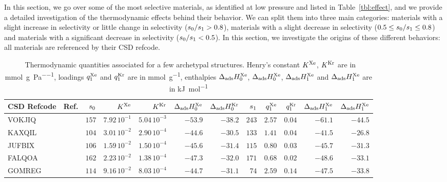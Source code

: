 \documentclass[main.tex]{subfiles}
\begin{document}
In this section, we go over some of the most selective materials, as identified at low pressure and listed in Table~\ref{tbl:effect}, and we provide a detailed investigation of the thermodynamic effects behind their behavior. We can split them into three main categories: materials with a slight increase in selectivity or little change in selectivity ($s_{\text{0}}/s_{\text{1}} > 0.8$), materials with a slight decrease in selectivity ($0.5 \le s_{\text{0}}/s_{\text{1}} \le 0.8$) and materials with a significant decrease in selectivity ($s_{\text{0}}/s_{\text{1}} < 0.5$). In this section, we investigate the origins of these different behaviors: all materials are referenced by their CSD refcode.

  
\begin{table}[hb]
\fontsize{8.5}{10.5}\selectfont
  \caption{\ Thermodynamic quantities associated for a few archetypal structures. Henry's constant $K^{\text{Xe}}$, $K^{\text{Kr}}$ are in \si{\milli\mol\per\gram\per\pascal}, loadings $q^{\text{Xe}}_{\text{1}}$ and $q^{\text{Kr}}_{\text{1}}$ are in \si{\milli\mol\per\gram}, enthalpies $\Delta_{\text{ads}}H^{\text{Xe}}_{\text{0}}$, $\Delta_{\text{ads}}H^{\text{Xe}}_{\text{0}}$, $\Delta_{\text{ads}}H^{\text{Xe}}_{\text{1}}$ and $\Delta_{\text{ads}}H^{\text{Xe}}_{\text{1}}$ are in \si{\kilo\joule\per\mol}}\label{tbl:thermo}
    \renewcommand{\arraystretch}{1.5}
    \begin{tabular}{|lr|rrrrr|rrrrr|}
    \hline
          CSD Refcode & Ref. &  $s_{\text{0}}$ &  $K^{\text{Xe}}$ &  $K^{\text{Kr}}$ &  $\Delta_{\text{ads}}H^{\text{Xe}}_{\text{0}}$ &  $\Delta_{\text{ads}}H^{\text{Kr}}_{\text{0}}$  &  $s_{\text{1}}$ &  $q^{\text{Xe}}_{\text{1}}$ &  $q^{\text{Kr}}_{\text{1}}$ &  $\Delta_{\text{ads}}H^{\text{Xe}}_{\text{1}}$ &  $\Delta_{\text{ads}}H^{\text{Xe}}_{\text{1}}$ \\
    \hline
        VOKJIQ &~\cite{VOKJIQ}        &  $157$  &  $7.92\,10^{-1}$  &  $5.04\,10^{-3}$  &  $-53.9$  &  $-38.2$  &  $243$  &  $2.57$  &  $0.04$  &  $-61.1$  &  $-44.5$  \\
        KAXQIL &~\cite{KAXQIL}        &  $104$  &  $3.01\,10^{-2}$  &  $2.90\,10^{-4}$  &  $-44.6$  &  $-30.5$  &  $133$  &  $1.41$  &  $0.04$  &  $-41.5$  &  $-26.8$  \\
        JUFBIX &~\cite{JUFBIX}        &  $106$  &  $1.59\,10^{-2}$  &  $1.50\,10^{-4}$  &  $-45.6$  &  $-31.4$  &  $115$  &  $0.80$  &  $0.03$  &  $-45.7$  &  $-31.3$  \\
        FALQOA &~\cite{FALQOA}        &  $162$  &  $2.23\,10^{-2}$  &  $1.38\,10^{-4}$  &  $-47.3$  &  $-32.0$  &  $171$  &  $0.68$  &  $0.02$  &  $-48.6$  &  $-33.1$  \\
        GOMREG &~\cite{GOMREG_GOMRAC} &  $114$  &  $9.16\,10^{-2}$  &  $8.03\,10^{-4}$  &  $-44.7$  &  $-31.1$  &  $ 74$  &  $2.59$  &  $0.14$  &  $-47.5$  &  $-33.8$  \\

\end{tabular}
\end{table}
\end{document}
